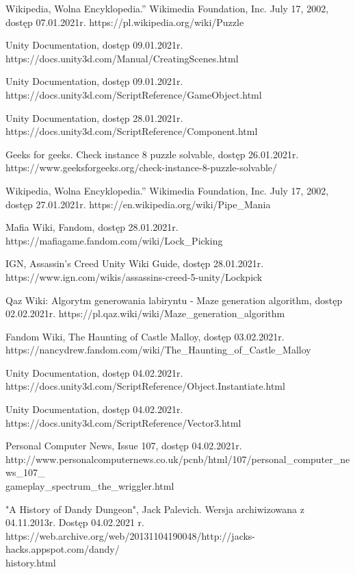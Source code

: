\documentclass[oneside,polski,logo]{amuthesis}
\begin{document}
\begin{thebibliography}{7}
Wikipedia, Wolna Encyklopedia.” Wikimedia Foundation, Inc. July 17, 2002, dostęp 07.01.2021r.
https://pl.wikipedia.org/wiki/Puzzle

Unity Documentation, dostęp 09.01.2021r.
https://docs.unity3d.com/Manual/CreatingScenes.html

Unity Documentation, dostęp 09.01.2021r.
https://docs.unity3d.com/ScriptReference/GameObject.html

Unity Documentation, dostęp 28.01.2021r.
https://docs.unity3d.com/ScriptReference/Component.html

Geeks for geeks. Check instance 8 puzzle solvable, dostęp 26.01.2021r.
https://www.geeksforgeeks.org/check-instance-8-puzzle-solvable/

Wikipedia, Wolna Encyklopedia.” Wikimedia Foundation, Inc. July 17, 2002, dostęp 27.01.2021r.
https://en.wikipedia.org/wiki/Pipe\_Mania

Mafia Wiki, Fandom, dostęp 28.01.2021r.
https://mafiagame.fandom.com/wiki/Lock\_Picking

IGN, Assassin's Creed Unity Wiki Guide, dostęp 28.01.2021r.
https://www.ign.com/wikis/assassins-creed-5-unity/Lockpick

Qaz Wiki: Algorytm generowania labiryntu - Maze generation algorithm, dostęp 02.02.2021r.
https://pl.qaz.wiki/wiki/Maze\_generation\_algorithm

Fandom Wiki, The Haunting of Castle Malloy, dostęp 03.02.2021r.
https://nancydrew.fandom.com/wiki/The\_Haunting\_of\_Castle\_Malloy

Unity Documentation, dostęp 04.02.2021r.
https://docs.unity3d.com/ScriptReference/Object.Instantiate.html

Unity Documentation, dostęp 04.02.2021r.
https://docs.unity3d.com/ScriptReference/Vector3.html

Personal Computer News, Issue 107, dostęp 04.02.2021r.
http://www.personalcomputernews.co.uk/pcnb/html/107/personal\_computer\_news\_107\_\\gameplay\_spectrum\_the\_wriggler.html

 "A History of Dandy Dungeon", Jack Palevich. Wersja archiwizowana z 04.11.2013r. Dostęp 04.02.2021 r.
https://web.archive.org/web/20131104190048/http://jacks-hacks.appspot.com/dandy/\\history.html


\end{thebibliography}
\end{document}
